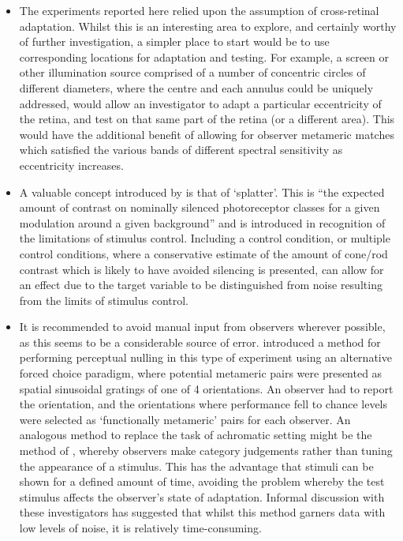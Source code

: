 \begin{itemize}
\item The experiments reported here relied upon the assumption of cross-retinal adaptation. Whilst this is an interesting area to explore, and certainly worthy of further investigation, a simpler place to start would be to use corresponding locations for adaptation and testing. For example, a screen or other illumination source comprised of a number of concentric circles of different diameters, where the centre and each annulus could be uniquely addressed, would allow an investigator to adapt a particular eccentricity of the retina, and test on that same part of the retina (or a different area). This would have the additional benefit of allowing for observer metameric matches which satisfied the various bands of different spectral sensitivity as eccentricity increases.
\item A valuable concept introduced by \citet{spitschan_selective_2015} is that of `splatter'. This is ``the expected amount of contrast on nominally silenced photoreceptor
classes for a given modulation around a given background'' and is introduced in recognition of the limitations of stimulus control. Including a control condition, or multiple control conditions, where a conservative estimate of the amount of cone/rod contrast which is likely to have avoided silencing is presented, can allow for an effect due to the target variable to be distinguished from noise resulting from the limits of stimulus control. 
\item It is recommended to avoid manual input from observers wherever possible, as this seems to be a considerable source of error. \citet{allen_form_2019} introduced a method for performing perceptual nulling in this type of experiment using an alternative forced choice paradigm, where potential metameric pairs were presented as spatial sinusoidal gratings of one of 4 orientations. An observer had to report the orientation, and the orientations where performance fell to chance levels were selected as `functionally metameric' pairs for each observer. An analogous method to replace the task of achromatic setting might be the method of \citet{smithson_colour_2004}, whereby observers make category judgements rather than tuning the appearance of a stimulus. This has the advantage that stimuli can be shown for a defined amount of time, avoiding the problem whereby the test stimulus affects the observer's state of adaptation. Informal discussion with these investigators has suggested that whilst this method garners data with low levels of noise, it is relatively time-consuming.

\end{itemize}
